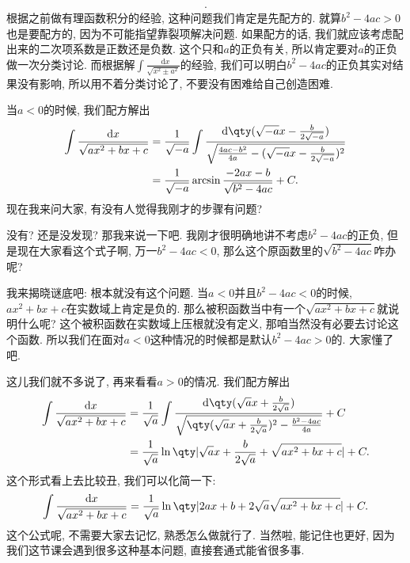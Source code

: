 \documentclass{ctexbook}
\newcommand*{\dif}{\mathop{}\!\mathrm{d}}
\begin{document}
{\begin{align*}
.\end{align*}
根据之前做有理函数积分的经验, 这种问题我们肯定是先配方的. 就算$b^{2}-4ac>0$也是要配方的, 因为不可能指望靠裂项解决问题. 如果配方的话, 我们就应该考虑配出来的二次项系数是正数还是负数. 这个只和$a$的正负有关, 所以肯定要对$a$的正负做一次分类讨论. 而根据解$\int\frac{\dif{x}}{\sqrt{x^{2}\pm a^{2}}}$的经验, 我们可以明白$b^{2}-4ac$的正负其实对结果没有影响, 所以用不着分类讨论了, 不要没有困难给自己创造困难. \par
当$a<0$的时候, 我们配方解出
\begin{align*}
\int\frac{\dif{x}}{\sqrt{ax^{2}+bx+c}}={}&\frac{1}{\sqrt{-a}}\int\frac{\dif{\qty(\sqrt{-a}x-\frac{b}{2\sqrt{-a}})}}{\sqrt{\frac{4ac-b^{2}}{4a}-(\sqrt{-a}x-\frac{b}{2\sqrt{-a}})^{2}}}\\
={}&\frac{1}{\sqrt{-a}}\arcsin{\frac{-2ax-b}{\sqrt{b^{2}-4ac}}}+C
.\end{align*}
现在我来问大家, 有没有人觉得我刚才的步骤有问题? \par
没有? 还是没发现? 那我来说一下吧. 我刚才很明确地讲不考虑$b^{2}-4ac$的正负, 但是现在大家看这个式子啊, 万一$b^{2}-4ac<0$, 那么这个原函数里的$\sqrt{b^{2}-4ac}$咋办呢? \par
我来揭晓谜底吧: 根本就没有这个问题. 当$a<0$并且$b^{2}-4ac<0$的时候, $ax^{2}+bx+c$在实数域上肯定是负的. 那么被积函数当中有一个$\sqrt{ax^{2}+bx+c}$就说明什么呢? 这个被积函数在实数域上压根就没有定义, 那咱当然没有必要去讨论这个函数. 所以我们在面对$a<0$这种情况的时候都是默认$b^{2}-4ac>0$的. 大家懂了吧. \par
这儿我们就不多说了, 再来看看$a>0$的情况. 我们配方解出
\begin{align*}
\int\frac{\dif{x}}{\sqrt{ax^{2}+bx+c}}={}&\frac{1}{\sqrt{a}}\int\frac{\dif{\qty(\sqrt{a}x+\frac{b}{2\sqrt{a}})}}{\sqrt{\qty(\sqrt{a}x+\frac{b}{2\sqrt{a}})^{2}-\frac{b^{2}-4ac}{4a}}}+C\\
={}&\frac{1}{\sqrt{a}}\ln\qty|\sqrt{a}x+\frac{b}{2\sqrt{a}}+\sqrt{ax^{2}+bx+c}|+C
.\end{align*}
这个形式看上去比较丑, 我们可以化简一下: 
\begin{align*}
\int\frac{\dif{x}}{\sqrt{ax^{2}+bx+c}}=\frac{1}{\sqrt{a}}\ln\qty|2ax+b+2\sqrt{a}\sqrt{ax^{2}+bx+c}|+C
.\end{align*}
这个公式呢, 不需要大家去记忆, 熟悉怎么做就行了. 当然啦, 能记住也更好, 因为我们这节课会遇到很多这种基本问题, 直接套通式能省很多事. \par
}
\end{document}
